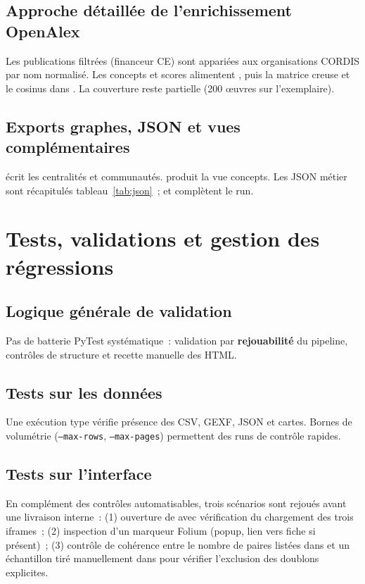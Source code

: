 \documentclass[12pt,a4paper,oneside]{article}
\begin{document}
\subsection{Approche détaillée de l'enrichissement OpenAlex}
Les publications filtrées (financeur CE) sont appariées aux organisations CORDIS par nom normalisé. Les concepts et scores alimentent , puis la matrice creuse et le cosinus dans . La couverture reste partielle (200 œuvres sur l'exemplaire).

\subsection{Exports graphes, JSON et vues complémentaires}
 écrit les centralités et communautés.  produit la vue concepts. Les JSON métier sont récapitulés tableau~\ref{tab:json}~;  et  complètent le run.

\section{Tests, validations et gestion des régressions}

\subsection{Logique générale de validation}
Pas de batterie PyTest systématique~: validation par \textbf{rejouabilité} du pipeline, contrôles de structure et recette manuelle des HTML.

\subsection{Tests sur les données}
Une exécution type vérifie présence des CSV, GEXF, JSON et cartes. Bornes de volumétrie (\texttt{--max-rows}, \texttt{--max-pages}) permettent des runs de contrôle rapides.

\subsection{Tests sur l'interface}
En complément des contrôles automatisables, trois scénarios sont rejoués avant une livraison interne~: (1) ouverture de  avec vérification du chargement des trois iframes~; (2) inspection d'un marqueur Folium (popup, lien vers fiche  si présent)~; (3) contrôle de cohérence entre le nombre de paires listées dans  et un échantillon tiré manuellement dans  pour vérifier l'exclusion des doublons explicites.
\end{document}
